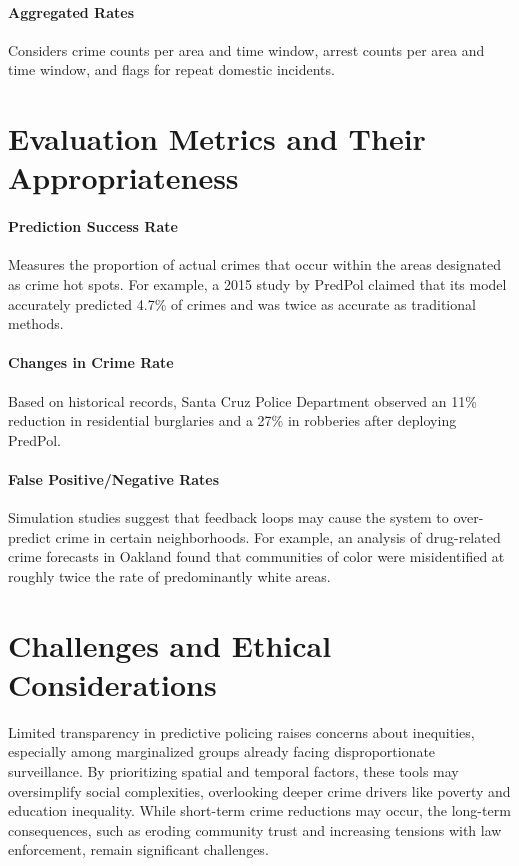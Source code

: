 \documentclass[11pt]{article}
\begin{document}
\paragraph{Aggregated Rates} Considers crime counts per area and time window, arrest counts per area and time window, and flags for repeat domestic incidents.

\section{Evaluation Metrics and Their Appropriateness}
\paragraph{Prediction Success Rate} Measures the proportion of actual crimes that occur within the areas designated as crime hot spots. For example, a 2015 study by PredPol claimed that its model accurately predicted 4.7\% of crimes and was twice as accurate as traditional methods.
\paragraph{Changes in Crime Rate} Based on historical records, Santa Cruz Police Department observed an 11\% reduction in residential burglaries and a 27\% in robberies after deploying PredPol.
\paragraph{False Positive/Negative Rates} Simulation studies suggest that feedback loops may cause the system to over-predict crime in certain neighborhoods. For example, an analysis of drug-related crime forecasts in Oakland found that communities of color were misidentified at roughly twice the rate of predominantly white areas.

\section{Challenges and Ethical Considerations}
Limited transparency in predictive policing raises concerns about inequities, especially among marginalized groups already facing disproportionate surveillance. By prioritizing spatial and temporal factors, these tools may oversimplify social complexities, overlooking deeper crime drivers like poverty and education inequality. While short-term crime reductions may occur, the long-term consequences, such as eroding community trust and increasing tensions with law enforcement, remain significant challenges.
\newpage


\end{document}
